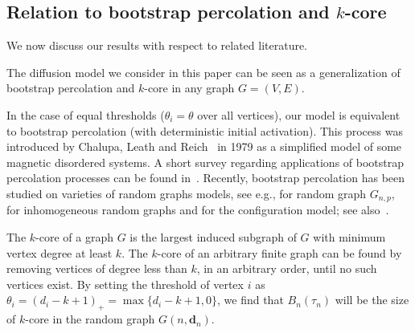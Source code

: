 \documentclass[11pt]{article}
\newtheorem{corollary}[theorem]{Corollary}
\def\tod{\stackrel{d}{\longrightarrow}}
\newcommand\bd{\mathbf{d}}
\def\tod{\stackrel{d}{\longrightarrow}}
\begin{document}

%


\subsection{Relation to bootstrap percolation and $k$-core}
We now discuss our results with respect to related literature. 

The diffusion model we consider in this paper can be seen as a generalization of bootstrap percolation and $k$-core in any graph $G=(V,E)$. 

In the case of equal thresholds ($\theta_i=\theta$ over all vertices), our model is equivalent to bootstrap percolation (with deterministic initial activation). This process was introduced by Chalupa, Leath and Reich~\cite{CLR79} in 1979 as a simplified model of some magnetic disordered systems. A short survey regarding applications of bootstrap percolation processes can be found in~\cite{Adl03}. Recently, bootstrap percolation has been studied on varieties of random graphs models, see e.g., \cite{janson2012bootstrap} for random graph $G_{n,p}$, \cite{fountoulakis2018phase, amini2014bootstrap, aminibootstrapIRG} for inhomogeneous random graphs and \cite{balpit07, amini10, lelarge12b} for the configuration model; see also~\cite{liu2012core, liu2016control, newman2006structure, boccaletti2006complex, dorogovtsev2008critical}.



The $k$-core of a graph $G$ is the largest induced subgraph of $G$ with minimum vertex degree at least $k$. The $k$-core of an arbitrary finite
graph can be found by removing vertices of degree less than $k$, in an arbitrary order, until no such vertices exist. By setting the threshold of vertex $i$ as $\theta_i=(d_i-k+1)_+=\max\{d_i-k+1,0\}$, we find that $B_n(\tau_n)$ will be the size of $k$-core in the random graph $G(n,\bd_n)$. 
\end{document}
